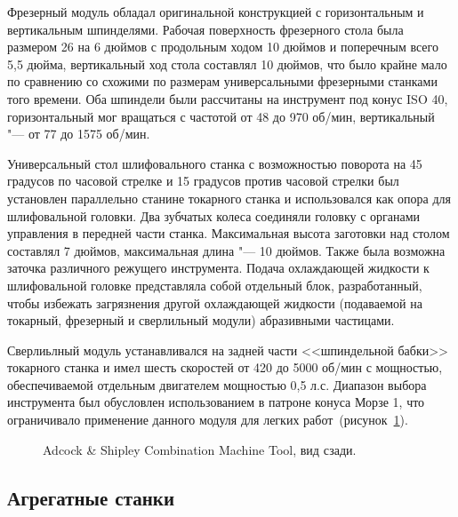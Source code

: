 Фрезерный модуль обладал оригинальной конструкцией с горизонтальным и вертикальным шпинделями. Рабочая поверхность фрезерного стола была размером 26 на 6 дюймов с продольным ходом 10 дюймов и поперечным всего 5,5 дюйма, вертикальный ход стола составлял 10 дюймов, что было крайне мало по сравнению со схожими по размерам универсальными фрезерными станками того времени. Оба шпиндели были рассчитаны на инструмент под конус ISO 40, горизонтальный мог вращаться с частотой от 48 до 970 об/мин, вертикальный "--- от 77 до 1575 об/мин.

Универсальный стол шлифовального станка с возможностью поворота на 45 градусов по часовой стрелке и 15 градусов против часовой стрелки был установлен параллельно станине токарного станка и использовался как опора для шлифовальной головки. Два зубчатых колеса соединяли головку с органами управления в передней части станка. Максимальная высота заготовки над столом составлял 7 дюймов, максимальная длина "--- 10 дюймов. Также была возможна заточка различного режущего инструмента. Подача охлаждающей жидкости к шлифовальной головке представляла собой отдельный блок, разработанный, чтобы избежать загрязнения другой охлаждающей жидкости (подаваемой на токарный, фрезерный и сверлильный модули) абразивными частицами.

Сверлиьлный модуль устанавливался на задней части <<шпиндельной бабки>> токарного станка и имел шесть скоростей от 420 до 5000 об/мин с мощностью, обеспечиваемой отдельным двигателем мощностью 0,5 л.с. Диапазон выбора инструмента был обусловлен использованием в патроне конуса Морзе 1, что ограничивало применение данного модуля для легких работ~(рисунок~\cref{fig:adcock-2}).

\begin{figure}[ht]
	\caption{Adcock \& Shipley Combination Machine Tool, вид сзади.}\label{fig:adcock-2}
\end{figure}

\subsection{Агрегатные станки}

